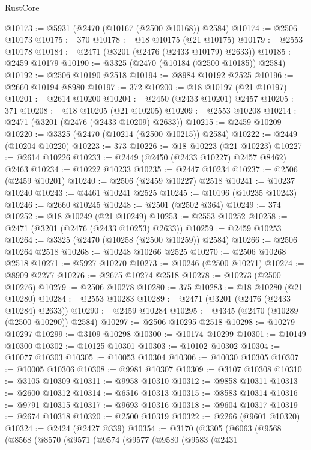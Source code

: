 \begin{lexlean}{RustCore}
\begin{coremodule}
@10173 := @5931 (@2470 (@10167 (@2500 @10168)) @2584)
@10174 := @2506 @10173
@10175 := 370
@10178 := @18 @10175 (@21 @10175)
@10179 := @2553 @10178
@10184 := @2471 (@3201 (@2476 (@2433 @10179) @2633))
@10185 := @2459 @10179
@10190 := @3325 (@2470 (@10184 (@2500 @10185)) @2584)
@10192 := @2506 @10190 @2518
@10194 := @8984 @10192 @2525
@10196 := @2660 @10194 @8980
@10197 := 372
@10200 := @18 @10197 (@21 @10197)
@10201 := @2614 @10200
@10204 := @2450 (@2433 @10201) @2457
@10205 := 371
@10208 := @18 @10205 (@21 @10205)
@10209 := @2553 @10208
@10214 := @2471 (@3201 (@2476 (@2433 @10209) @2633))
@10215 := @2459 @10209
@10220 := @3325 (@2470 (@10214 (@2500 @10215)) @2584)
@10222 := @2449 (@10204 @10220)
@10223 := 373
@10226 := @18 @10223 (@21 @10223)
@10227 := @2614 @10226
@10233 := @2449 (@2450 (@2433 @10227) @2457 @8462) @2463
@10234 := @10222 @10233
@10235 := @2447 @10234
@10237 := @2506 (@2459 @10201)
@10240 := @2506 (@2459 @10227) @2518
@10241 := @10237 @10240
@10243 := @4461 @10241 @2525
@10245 := @10196 (@10235 @10243)
@10246 := @2660 @10245
@10248 := @2501 (@2502 @364)
@10249 := 374
@10252 := @18 @10249 (@21 @10249)
@10253 := @2553 @10252
@10258 := @2471 (@3201 (@2476 (@2433 @10253) @2633))
@10259 := @2459 @10253
@10264 := @3325 (@2470 (@10258 (@2500 @10259)) @2584)
@10266 := @2506 @10264 @2518
@10268 := @10248 @10266 @2525
@10270 := @2506 @10268 @2518
@10271 := @5927 @10270
@10273 := @10246 (@2500 @10271)
@10274 := @8909 @2277
@10276 := @2675 @10274 @2518
@10278 := @10273 (@2500 @10276)
@10279 := @2506 @10278
@10280 := 375
@10283 := @18 @10280 (@21 @10280)
@10284 := @2553 @10283
@10289 := @2471 (@3201 (@2476 (@2433 @10284) @2633))
@10290 := @2459 @10284
@10295 := @4345 (@2470 (@10289 (@2500 @10290)) @2584)
@10297 := @2506 @10295 @2518
@10298 := @10279 @10297
@10299 := @3109 @10298
@10300 := @10174 @10299
@10301 := @10149 @10300
@10302 := @10125 @10301
@10303 := @10102 @10302
@10304 := @10077 @10303
@10305 := @10053 @10304
@10306 := @10030 @10305
@10307 := @10005 @10306
@10308 := @9981 @10307
@10309 := @3107 @10308
@10310 := @3105 @10309
@10311 := @9958 @10310
@10312 := @9858 @10311
@10313 := @2600 @10312
@10314 := @6516 @10313
@10315 := @8583 @10314
@10316 := @9791 @10315
@10317 := @9693 @10316
@10318 := @9604 @10317
@10319 := @2674 @10318
@10320 := @2500 @10319
@10322 := @2266 (@9601 @10320)
@10324 := @2424 (@2427 @339)
@10354 := @3170
    (@3305
      (@6063
        (@9568
          (@8568
            (@8570
              (@9571
                (@9574
                  (@9577
                    (@9580
                      (@9583
                        (@2431

\end{coremodule}
\end{lexlean}
